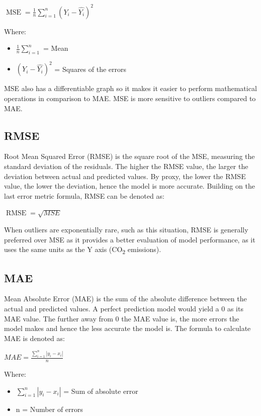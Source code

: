 \documentclass{mcmthesis}
\begin{document}
    ${\operatorname {MSE} ={\frac {1}{n}}\sum _{i=1}^{n}\left(Y_{i}-{\hat {Y_{i}}}\right)^{2}}$
    
    Where:
    \begin{itemize}
        \item ${\frac {1}{n}\sum _{i=1}^{n}}$ = Mean
        \item ${\left(Y_{i}-{\hat {Y_{i}}}\right)^{2}}$ = Squares of the errors
    \end{itemize}
    
     MSE also has a differentiable graph so it makes it easier to perform mathematical operations in comparison to MAE. MSE is more sensitive to outliers compared to MAE. 

    \subsection{RMSE}
    Root Mean Squared Error (RMSE) is the square root of the MSE, measuring the standard deviation of the residuals. The higher the RMSE value, the larger the deviation between actual and predicted values. By proxy, the lower the RMSE value, the lower the deviation, hence the model is more accurate. Building on the last error metric formula, RMSE can be denoted as:
    
    ${\operatorname {RMSE} = \sqrt{MSE}}$
    
    When outliers are exponentially rare, such as this situation, RMSE is generally preferred over MSE as it provides a better evaluation of model performance, as it uses the same units as the Y axis (CO\textsubscript{2} emissions).

    \subsection{MAE}
    Mean Absolute Error (MAE) is the sum of the absolute difference between the actual and predicted values. A perfect prediction model would yield a 0 as its MAE value. The further away from 0 the MAE value is, the more errors the model makes and hence the less accurate the model is. The formula to calculate MAE is denoted as:

    ${\displaystyle {MAE} ={\frac {\sum _{i=1}^{n}\left|y_{i}-x_{i}\right|}{n}}}$
    
    Where:
    \begin{itemize}
        \item ${\sum _{i=1}^{n}\left|y_{i}-x_{i}\right|}$ = Sum of absolute error
        \item {n} = Number of errors
    \end{itemize}
\end{document}
